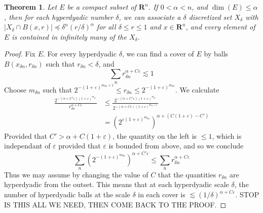 \documentclass{report}
\theoremstyle{plain}
\theoremstyle{plain}
\newtheorem{theorem}{Theorem}
\begin{document}
\begin{theorem}
    Let $E$ be a compact subset of $\mathbf{R}^n$. If $0 < \alpha < n$, and $\dim(E) \leq \alpha$, then for each hyperdyadic number $\delta$, we can associate a $\delta$ discretized set $X_\delta$ with $|X_\delta \cap B(x,r)| \preccurlyeq \delta^n (r/\delta)^\alpha$ for all $\delta \leq r \leq 1$ and $x \in \mathbf{R}^n$, and every element of $E$ is contained in infinitely many of the $X_\delta$.
\end{theorem}
\begin{proof}
    Fix $E$. For every hyperdyadic $\delta$, we can find a cover of $E$ by balls $B(x_{\delta n}, r_{\delta n})$ such that $r_{\delta n} < \delta$, and
    \begin{equation} \sum_n r_{\delta n}^{\alpha + C\varepsilon} \lesssim 1 \end{equation}
    Choose $m_{\delta n}$ such that $2^{-(1 + \varepsilon)^{m_{\delta n}+1}} \leq r_{\delta n} \leq 2^{-(1 + \varepsilon)^{m_{\delta n}}}$. We calculate
    \begin{align*}
        \frac{2^{-(\alpha + C'\varepsilon) (1 + \varepsilon)^{m_{\delta n}}}}{r_{\delta n}^{\alpha + C\varepsilon}} &\leq \frac{2^{- (\alpha + C'\varepsilon) (1 + \varepsilon)^{m_{\delta n}}}}{2^{- (\alpha + C\varepsilon) (1 + \varepsilon)^{m_{\delta n} + 1}}}\\
        &= \left( 2^{\varepsilon (1 + \varepsilon)^{m_{\delta n}}} \right)^{\alpha + (C (1 + \varepsilon) - C')}
    \end{align*}
    Provided that $C' > \alpha + C(1 + \varepsilon)$, the quantity on the left is $\leq 1$, which is independant of $\varepsilon$ provided that $\varepsilon$ is bounded from above, and so we conclude
    \[ \sum_n \left( 2^{-(1 + \varepsilon)^{m_{\delta n}}} \right)^{\alpha + C' \varepsilon} \leq \sum_n r_{\delta n}^{\alpha + C\varepsilon} \]
    Thus we may assume by changing the value of $C$ that the quantities $r_{\delta n}$ are hyperdyadic from the outset. This means that at each hyperdyadic scale $\delta$, the number of hyperdyadic balls at the scale $\delta$ in each cover is $\lesssim (1/\delta)^{\alpha + C\varepsilon}$. STOP IS THIS ALL WE NEED, THEN COME BACK TO THE PROOF.



\end{proof}
\end{document}
